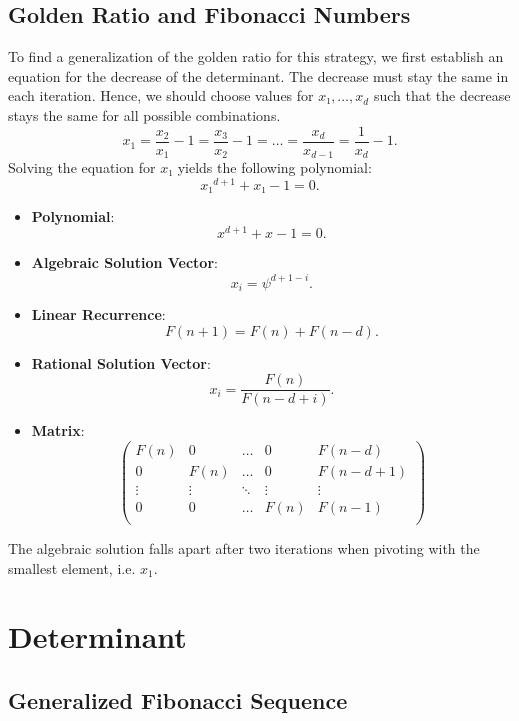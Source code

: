 \documentclass[english,version-2020-11]{uzl-thesis}
\begin{document}
\section{Golden Ratio and Fibonacci Numbers}

To find a generalization of the golden ratio for this strategy,
we first establish an equation for the decrease of the determinant.
The decrease must stay the same in each iteration.
Hence, we should choose values for $x₁, \dots, x_d$ such that the decrease
stays the same for all possible combinations.
\[
  x_1 = \frac{x_2}{x_1} - 1 = \frac{x_3}{x_2} - 1 = \dots = \frac{x_d}{x_{d-1}} = \frac{1}{x_d} - 1.
\]
Solving the equation for $x₁$ yields the following polynomial:
\[
  x₁^{d+1} + x₁ - 1 = 0.
\]

\begin{itemize}
  \item \textbf{Polynomial}: \[x^{d+1} + x - 1 = 0.\]
  \item \textbf{Algebraic Solution Vector}: \[x_i = \psi^{d+1-i}.\]
  \item \textbf{Linear Recurrence}: \[F(n + 1) = F(n) + F(n - d).\]
  \item \textbf{Rational Solution Vector}: \[x_i = \frac{F(n)}{F(n-d+i)}.\]
  \item \textbf{Matrix}:
    \[\left(\begin{array}{cccc|c}
      F(n)   & 0      & \dots  & 0      & F(n - d) \\
        0    & F(n)   & \dots  & 0      & F(n - d + 1) \\
      \vdots & \vdots & \ddots & \vdots & \vdots   \\
        0    & 0      & \dots  & F(n)   & F(n - 1) \\
    \end{array}\right)\]
\end{itemize}

The algebraic solution falls apart after two iterations when pivoting with the
smallest element, i.e. $x_1$.


\chapter{Determinant}


\section{Generalized Fibonacci Sequence}
\end{document}
